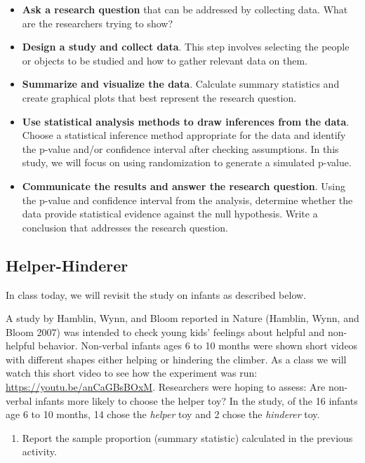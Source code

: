 \documentclass[
]{report}
\providecommand{\tightlist}{%
  \setlength{\itemsep}{0pt}\setlength{\parskip}{0pt}}
\begin{document}
\begin{itemize}
\item
  \textbf{Ask a research question} that can be addressed by collecting data. What are the researchers trying to show?
\item
  \textbf{Design a study and collect data}. This step involves selecting the people or objects to be studied and how to gather relevant data on them.
\item
  \textbf{Summarize and visualize the data}. Calculate summary statistics and create graphical plots that best represent the research question.
\item
  \textbf{Use statistical analysis methods to draw inferences from the data}. Choose a statistical inference method appropriate for the data and identify the p-value and/or confidence interval after checking assumptions. In this study, we will focus on using randomization to generate a simulated p-value.
\item
  \textbf{Communicate the results and answer the research question}. Using the p-value and confidence interval from the analysis, determine whether the data provide statistical evidence against the null hypothesis. Write a conclusion that addresses the research question.
\end{itemize}

\subsection{Helper-Hinderer}\label{helper-hinderer-1}

In class today, we will revisit the study on infants as described below.

A study by Hamblin, Wynn, and Bloom reported in Nature (Hamblin, Wynn, and Bloom 2007) was intended to check young kids' feelings about helpful and non-helpful behavior. Non-verbal infants ages 6 to 10 months were shown short videos with different shapes either helping or hindering the climber. As a class we will watch this short video to see how the experiment was run: \url{https://youtu.be/anCaGBsBOxM}. Researchers were hoping to assess: Are non-verbal infants more likely to choose the helper toy? In the study, of the 16 infants age 6 to 10 months, 14 chose the \emph{helper} toy and 2 chose the \emph{hinderer} toy.

\begin{enumerate}
\def\labelenumi{\arabic{enumi}.}
\tightlist
\item
  Report the sample proportion (summary statistic) calculated in the previous activity.
\end{enumerate}
\end{document}
